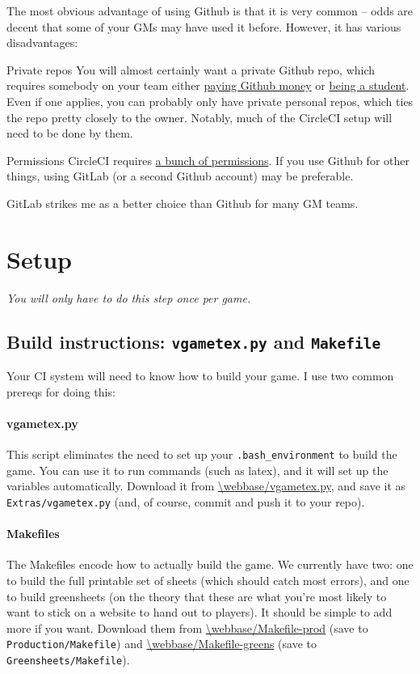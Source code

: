 \documentclass[green]{testgame}
\begin{document}
The most obvious advantage of using Github is that it is very common -- odds are decent that some of your GMs may have used it before. However, it has various disadvantages:
\begin{desc}
    \item[Private repos] You will almost certainly want a private Github repo, which requires somebody on your team either \href{https://github.com/pricing}{paying Github money} or \href{https://education.github.com/pack}{being a student}. Even if one applies, you can probably only have private personal repos, which ties the repo pretty closely to the owner. Notably, much of the CircleCI setup will need to be done by them.
    \item[Permissions] CircleCI requires \href{https://circleci.com/docs/github-permissions/}{a bunch of permissions}. If you use Github for other things, using GitLab (or a second Github account) may be preferable.
\end{desc}

GitLab strikes me as a better choice than Github for many GM teams.

\section{Setup}

\emph{You will only have to do this step once per game.}

\subsection{Build instructions: \texttt{vgametex.py} and \texttt{Makefile}}

Your CI system will need to know how to build your game. I use two common prereqs for doing this:

\paragraph*{vgametex.py} This script eliminates the need to set up your \texttt{.bash\_environment} to build the game. You can use it to run commands (such as latex), and it will set up the \GameTeX{} variables automatically. Download it from \url{\webbase/vgametex.py}, and save it as \texttt{Extras/vgametex.py} (and, of course, commit and push it to your repo).

\paragraph*{Makefiles} The Makefiles encode how to actually build the game. We currently have two: one to build the full printable set of sheets (which should catch most errors), and one to build greensheets (on the theory that these are what you're most likely to want to stick on a website to hand out to players). It should be simple to add more if you want. Download them from \url{\webbase/Makefile-prod} (save to \texttt{Production/Makefile}) and \url{\webbase/Makefile-greens} (save to \texttt{Greensheets/Makefile}).
\end{document}
